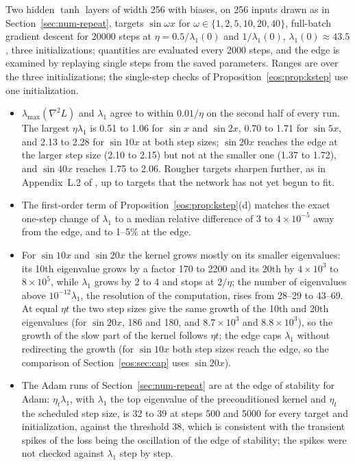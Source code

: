 Two hidden $\tanh$ layers of width 256 with biases, on 256 inputs drawn as in Section~\ref{sec:num-repeat}, targets $\sin\omega x$ for $\omega\in\{1,2,5,10,20,40\}$, full-batch gradient descent for 20000 steps at $\eta = 0.5/\lambda_1(0)$ and $1/\lambda_1(0)$, $\lambda_1(0)\approx43.5$, three initializations; quantities are evaluated every 2000 steps, and the edge is examined by replaying single steps from the saved parameters. Ranges are over the three initializations; the single-step checks of Proposition~\ref{eos:prop:kstep} use one initialization.
\begin{itemize}
\item $\lambda_{\max}(\nabla^2L)$ and $\lambda_1$ agree to within $0.01/\eta$ on the second half of every run. The largest $\eta\lambda_1$ is 0.51 to 1.06 for $\sin x$ and $\sin2x$, 0.70 to 1.71 for $\sin5x$, and 2.13 to 2.28 for $\sin10x$ at both step sizes; $\sin20x$ reaches the edge at the larger step size (2.10 to 2.15) but not at the smaller one (1.37 to 1.72), and $\sin40x$ reaches 1.75 to 2.06. Rougher targets sharpen further, as in Appendix~L.2 of \cite{cohen2021}, up to targets that the network has not yet begun to fit.
\item The first-order term of Proposition~\ref{eos:prop:kstep}(d) matches the exact one-step change of $\lambda_1$ to a median relative difference of $3$ to $4\times10^{-5}$ away from the edge, and to 1--5\% at the edge.
\item For $\sin10x$ and $\sin20x$ the kernel grows mostly on its smaller eigenvalues: its 10th eigenvalue grows by a factor 170 to 2200 and its 20th by $4\times10^3$ to $8\times10^5$, while $\lambda_1$ grows by 2 to 4 and stops at $2/\eta$; the number of eigenvalues above $10^{-12}\lambda_1$, the resolution of the computation, rises from 28--29 to 43--69. At equal $\eta t$ the two step sizes give the same growth of the 10th and 20th eigenvalues (for $\sin20x$, 186 and 180, and $8.7\times10^3$ and $8.8\times10^3$), so the growth of the slow part of the kernel follows $\eta t$; the edge caps $\lambda_1$ without redirecting the growth (for $\sin10x$ both step sizes reach the edge, so the comparison of Section~\ref{eos:sec:cap} uses $\sin20x$).
\item The Adam runs of Section~\ref{sec:num-repeat} are at the edge of stability for Adam: $\eta_t\lambda_1$, with $\lambda_1$ the top eigenvalue of the preconditioned kernel and $\eta_t$ the scheduled step size, is 32 to 39 at steps 500 and 5000 for every target and initialization, against the threshold 38, which is consistent with the transient spikes of the loss being the oscillation of the edge of stability; the spikes were not checked against $\lambda_1$ step by step.
\end{itemize}
